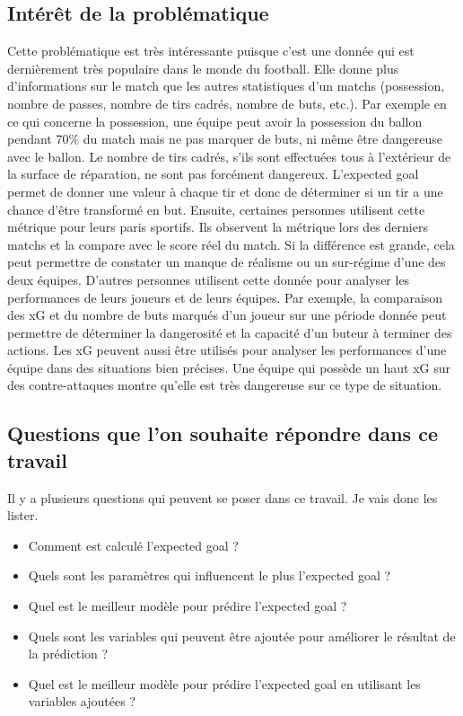 \documentclass[12pt]{article}
\begin{document}
\subsection{Intérêt de la problématique}
\noindent Cette problématique est très intéressante puisque c'est une donnée qui est dernièrement très populaire dans le monde du football. Elle donne plus d'informations sur le match que les autres statistiques d'un matchs (possession, nombre de passes, nombre de tirs cadrés, nombre de buts, etc.). Par exemple en ce qui concerne la possession, une équipe peut avoir la possession du ballon pendant 70\% du match mais ne pas marquer de buts, ni même être dangereuse avec le ballon. Le nombre de tirs cadrés, s'ils sont effectuées tous à l'extérieur de la surface de réparation, ne sont pas forcément dangereux. L'expected goal permet de donner une valeur à chaque tir et donc de déterminer si un tir a une chance d'être transformé en but.
\newline \newline
Ensuite, certaines personnes utilisent cette métrique pour leurs paris sportifs. Ils observent la métrique lors des derniers matchs et la compare avec le score réel du match. Si la différence est grande, cela peut permettre de constater un manque de réalisme ou un sur-régime d'une des deux équipes. \cite{tennerelBienUtiliserExpected2022a}
\newline \newline
D'autres personnes utilisent cette donnée pour analyser les performances de leurs joueurs et de leurs équipes. Par exemple, la comparaison des xG et du nombre de buts marqués d'un joueur sur une période donnée peut permettre de déterminer la dangerosité et la capacité d'un buteur à terminer des actions. \cite{pettyWhatExpectedGoals2018a}
Les xG peuvent aussi être utilisés pour analyser les performances d'une équipe dans des situations bien précises. Une équipe qui possède un haut xG sur des contre-attaques montre qu'elle est très dangereuse sur ce type de situation. \cite{XGExplainedFBrefa}

\subsection{Questions que l'on souhaite répondre dans ce travail}
\noindent Il y a plusieurs questions qui peuvent se poser dans ce travail. Je vais donc les lister.
\begin{itemize}
    \item Comment est calculé l'expected goal ?
    \item Quels sont les paramètres qui influencent le plus l'expected goal ?
    \item Quel est le meilleur modèle pour prédire l'expected goal ?
    \item Quels sont les variables qui peuvent être ajoutée pour améliorer le résultat de la prédiction ?
    \item Quel est le meilleur modèle pour prédire l'expected goal en utilisant les variables ajoutées ?
\end{itemize}
\end{document}
